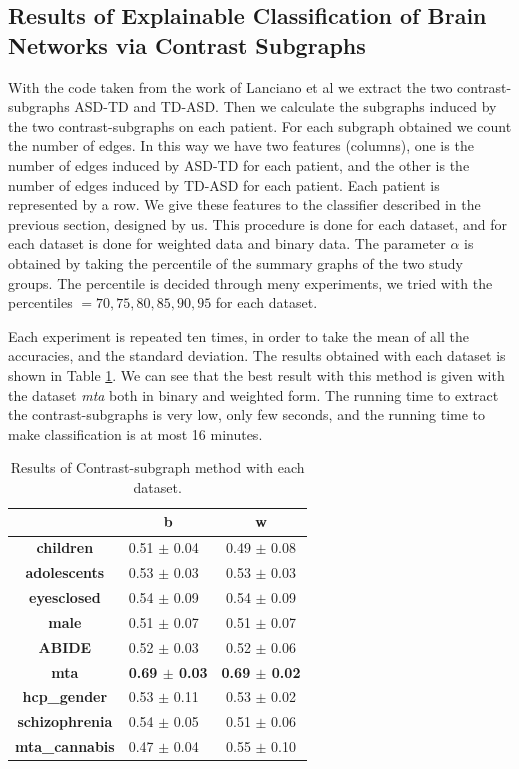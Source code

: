 \subsection{Results of Explainable Classification of Brain Networks via Contrast Subgraphs}

With the code taken from the work of Lanciano et al \cite{lanciano2020cs} we extract the two contrast-subgraphs ASD-TD and TD-ASD. Then we calculate the subgraphs induced by the two contrast-subgraphs on each patient. For each subgraph obtained we count the number of edges. In this way we have two features (columns), one is the number of edges induced by ASD-TD for each patient, and the other is the number of edges induced by TD-ASD for each patient.  Each patient is represented by a row. We give these features to the classifier described in the previous section, designed by us. This procedure is done for each dataset, and for each dataset is done for weighted data and binary data. The parameter $\alpha$ is obtained by taking the percentile of the summary graphs of the two study groups. The percentile is decided through meny experiments, we tried with the percentiles $ = {70, 75, 80, 85, 90, 95}$ for each dataset.
\vspace{0.5cm}

Each experiment is repeated ten times, in order to take the mean of all the accuracies, and the standard deviation. The results obtained with each dataset is shown in Table \ref{tab:c-s}. We can see that the best result with this method is given with the dataset \textit{mta} both in binary and weighted form. The running time to extract the contrast-subgraphs is very low, only few seconds, and the running time to make classification is at most 16 minutes.
\vspace{0.5cm}
\begin{table}
	\centering
	\begin{tabular}{c|l|c} 
		\toprule
		& \multicolumn{1}{c|}{b} & w                \\ 
		\midrule
		\textbf{children}      & 0.51 $\pm$ 0.04        & 0.49 $\pm$ 0.08  \\
		\textbf{adolescents}   & 0.53 $\pm$ 0.03        & 0.53 $\pm$ 0.03  \\
		\textbf{eyesclosed}    & 0.54 $\pm$ 0.09        & 0.54 $\pm$ 0.09  \\
		\textbf{male}          & 0.51 $\pm$ 0.07        & 0.51 $\pm$ 0.07  \\
		\textbf{ABIDE}         & 0.52 $\pm$ 0.03        & 0.52 $\pm$ 0.06  \\
		\textbf{mta}           & \textbf{0.69 $\pm$ 0.03}        & \textbf{0.69 $\pm$ 0.02}  \\
		\textbf{hcp\_gender}   & 0.53 $\pm$ 0.11        & 0.53 $\pm$ 0.02  \\
		\textbf{schizophrenia} & 0.54 $\pm$ 0.05        & 0.51 $\pm$ 0.06  \\
		\textbf{mta\_cannabis} & 0.47 $\pm$ 0.04        & 0.55 $\pm$ 0.10 
	\end{tabular}
	\caption{Results of Contrast-subgraph method with each dataset.}
	\label{tab:c-s}
\end{table}

